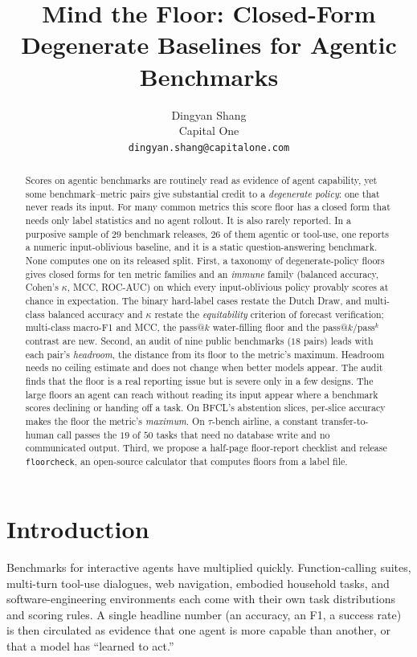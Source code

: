 \documentclass{article}
\title{Mind the Floor: Closed-Form Degenerate Baselines for Agentic Benchmarks}
\author{%
  Dingyan Shang\\
  Capital One\\
  \texttt{dingyan.shang@capitalone.com}
}
\theoremstyle{plain}
\theoremstyle{definition}
\newcommand{\floorcheck}{\texttt{floorcheck}}
\begin{document}
\maketitle

\begin{abstract}
  Scores on agentic benchmarks are routinely read as evidence of agent capability, yet some benchmark--metric pairs give substantial credit to a \emph{degenerate policy}: one that never reads its input. For many common metrics this score floor has a closed form that needs only label statistics and no agent rollout. It is also rarely reported. In a purposive sample of $29$ benchmark releases, $26$ of them agentic or tool-use, one reports a numeric input-oblivious baseline, and it is a static question-answering benchmark. None computes one on its released split. First, a taxonomy of degenerate-policy floors gives closed forms for ten metric families and an \emph{immune} family (balanced accuracy, Cohen's $\kappa$, MCC, ROC-AUC) on which every input-oblivious policy provably scores at chance in expectation. The binary hard-label cases restate the Dutch Draw, and multi-class balanced accuracy and $\kappa$ restate the \emph{equitability} criterion of forecast verification; multi-class macro-F1 and MCC, the pass@$k$ water-filling floor and the pass@$k$/pass$^{k}$ contrast are new. Second, an audit of nine public benchmarks ($18$ pairs) leads with each pair's \emph{headroom}, the distance from its floor to the metric's maximum. Headroom needs no ceiling estimate and does not change when better models appear. The audit finds that the floor is a real reporting issue but is severe only in a few designs. The large floors an agent can reach without reading its input appear where a benchmark scores declining or handing off a task. On BFCL's abstention slices, per-slice accuracy makes the floor the metric's \emph{maximum}. On $\tau$-bench airline, a constant transfer-to-human call passes the $19$ of $50$ tasks that need no database write and no communicated output. Third, we propose a half-page floor-report checklist and release \floorcheck{}, an open-source calculator that computes floors from a label file.
\end{abstract}

\section{Introduction}
\label{sec:intro}

Benchmarks for interactive agents have multiplied quickly. Function-calling suites, multi-turn tool-use dialogues, web navigation, embodied household tasks, and software-engineering environments each come with their own task distributions and scoring rules. A single headline number (an accuracy, an F1, a success rate) is then circulated as evidence that one agent is more capable than another, or that a model has ``learned to act.''
\end{document}
